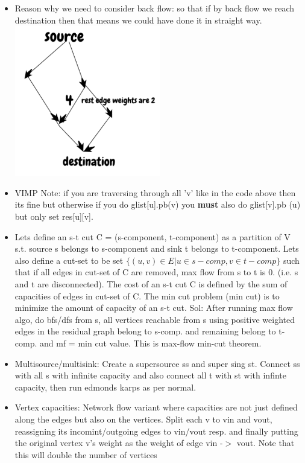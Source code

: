 \documentclass[8pt, a4paper, oneside, twocolumn]{extarticle}
\begin{document}
\begin{itemize}
    \item Reason why we need to consider back flow: so that if by back flow we reach destination then that means we could have done it in straight way. 
    \includegraphics[width=0.5\textwidth,height=0.5\textheight,keepaspectratio]{bflow} 
    \item VIMP Note: if you are traversing through all 'v' like in the code above then its fine but otherwise if you do glist[u].pb(v) you \textbf{must} also do glist[v].pb (u) but only set res[u][v].
    \item Lets define an s-t cut C = (s-component, t-component) as a partition of V s.t. source s belongs to s-component and sink t belongs to t-component. Lets also define a cut-set to be set $\{(u, v) \in E | u \in s-comp, v \in t-comp\}$ such that if all edges in cut-set of C are removed, max flow from s to t is 0. (i.e. s and t are disconnected). The cost of an s-t cut C is defined by the sum of capacities of edges in cut-set of C. The min cut problem (min cut) is to minimize the amount of capacity of an s-t cut. Sol: After running max flow algo, do bfs/dfs from s, all vertices reachable from s using positive weighted edges in the residual graph belong to s-comp. and remaining belong to t-comp. and mf = min cut value. This is max-flow min-cut theorem.
    \item Multisource/multisink: Create a supersource ss and super sing st. Connect ss with all s with infinite capacity and also connect all t with st with infinte capacity, then run edmonds karps as per normal.
    \item Vertex capacities: Network flow variant where capacities are not just defined along the edges but also on the vertices. Split each v to vin and vout, reassigning its incomint/outgoing edges to vin/vout resp. and finally putting the original vertex v's weight as the weight of edge vin -$>$ vout. Note that this will double the number of vertices

\end{itemize}
\end{document}
